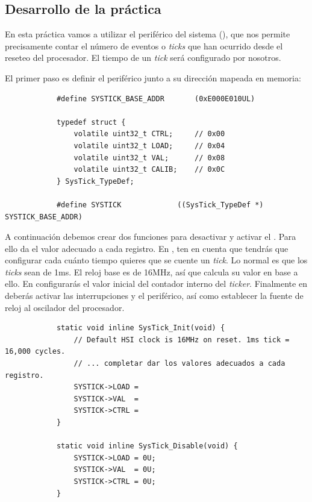 \documentclass[../main.tex]{subfiles}
\begin{document}
    \subsection{Desarrollo de la práctica}

        En esta práctica vamos a utilizar el periférico  del sistema (\PMMAN[4.4]), que nos permite precisamente contar el número de eventos o \emph{ticks} que han ocurrido desde el reseteo del procesador. El tiempo de un \emph{tick} será configurado por nosotros.

        El primer paso es definir el periférico junto a su dirección mapeada en memoria:

        \begin{lstlisting}
            #define SYSTICK_BASE_ADDR  		(0xE000E010UL)

            typedef struct {
                volatile uint32_t CTRL;     // 0x00
                volatile uint32_t LOAD;     // 0x04
                volatile uint32_t VAL;      // 0x08
                volatile uint32_t CALIB;    // 0x0C
            } SysTick_TypeDef;

            #define SYSTICK           	((SysTick_TypeDef *) SYSTICK_BASE_ADDR)
        \end{lstlisting}

        A continuación debemos crear dos funciones para desactivar y activar el . Para ello da el valor adecuado a cada registro. En , ten en cuenta que tendrás que configurar cada cuánto tiempo quieres que se cuente un \emph{tick}. Lo normal es que los \emph{ticks} sean de 1ms. El reloj base es de 16MHz, así que calcula su valor en base a ello. En  configurarás el valor inicial del contador interno del  \emph{ticker}. Finalmente en  deberás activar las interrupciones y el periférico, así como establecer la fuente de reloj al oscilador del procesador.

        \begin{lstlisting}
            static void inline SysTick_Init(void) {
                // Default HSI clock is 16MHz on reset. 1ms tick = 16,000 cycles.
                // ... completar dar los valores adecuados a cada registro.
                SYSTICK->LOAD = 
                SYSTICK->VAL  = 
                SYSTICK->CTRL = 
            }

            static void inline SysTick_Disable(void) {
                SYSTICK->LOAD = 0U;
                SYSTICK->VAL  = 0U;
                SYSTICK->CTRL = 0U;
            }
        \end{lstlisting}
\end{document}
